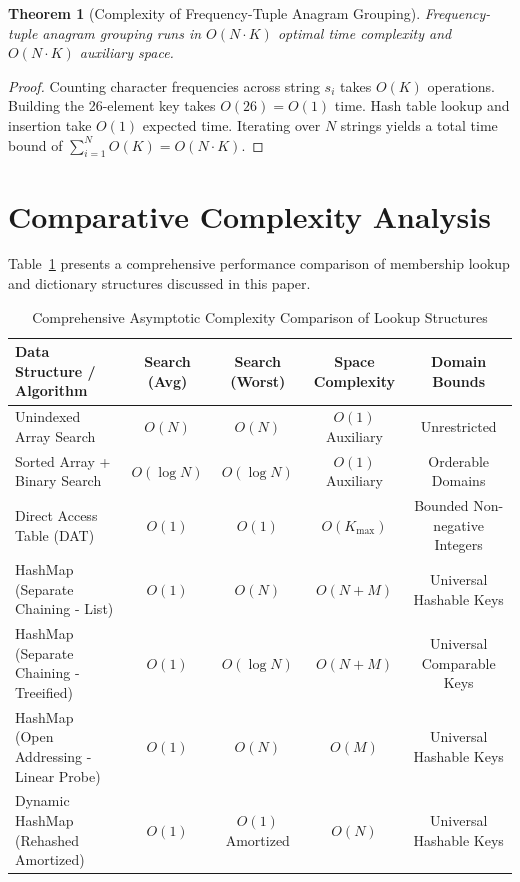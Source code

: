 \documentclass[10pt,journal,compsoc,onecolumn]{IEEEtran}
\newtheorem{theorem}{Theorem}
\begin{document}
\begin{theorem}[Complexity of Frequency-Tuple Anagram Grouping]
Frequency-tuple anagram grouping runs in $O(N \cdot K)$ optimal time complexity and $O(N \cdot K)$ auxiliary space.
\end{theorem}
\begin{proof}
Counting character frequencies across string $s_i$ takes $O(K)$ operations. Building the 26-element key takes $O(26) = O(1)$ time. Hash table lookup and insertion take $O(1)$ expected time. Iterating over $N$ strings yields a total time bound of $\sum_{i=1}^N O(K) = O(N \cdot K)$.
\end{proof}

\section{Comparative Complexity Analysis}
\label{sec:comparative-analysis}

Table~\ref{tab:hashmap-complexity} presents a comprehensive performance comparison of membership lookup and dictionary structures discussed in this paper.

\begin{table}[htbp]
\centering
\caption{Comprehensive Asymptotic Complexity Comparison of Lookup Structures}
\label{tab:hashmap-complexity}
\begin{tabular}{lcccc}
\toprule
\textbf{Data Structure / Algorithm} & \textbf{Search (Avg)} & \textbf{Search (Worst)} & \textbf{Space Complexity} & \textbf{Domain Bounds} \\
\midrule
Unindexed Array Search & $O(N)$ & $O(N)$ & $O(1)$ Auxiliary & Unrestricted \\
Sorted Array + Binary Search & $O(\log N)$ & $O(\log N)$ & $O(1)$ Auxiliary & Orderable Domains \\
Direct Access Table (DAT) & $O(1)$ & $O(1)$ & $O(K_{\max})$ & Bounded Non-negative Integers \\
HashMap (Separate Chaining - List) & $O(1)$ & $O(N)$ & $O(N + M)$ & Universal Hashable Keys \\
HashMap (Separate Chaining - Treeified) & $O(1)$ & $O(\log N)$ & $O(N + M)$ & Universal Comparable Keys \\
HashMap (Open Addressing - Linear Probe) & $O(1)$ & $O(N)$ & $O(M)$ & Universal Hashable Keys \\
Dynamic HashMap (Rehashed Amortized) & $O(1)$ & $O(1)$ Amortized & $O(N)$ & Universal Hashable Keys \\
\bottomrule
\end{tabular}
\end{table}
\end{document}
